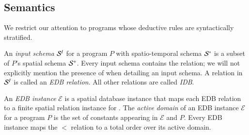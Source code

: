 



\subsection{Semantics}
\label{sec:semantics}
We restrict our attention to \lang programs whose deductive rules are syntactically stratified.


An {\em input schema} $\ischema$ for a \lang program $P$ with spatio-temporal schema $\stschema$ is a subset of $P$'s spatial schema $\sschema$.  Every input schema contains the  relation; we will not explicitly mention the presence of  when detailing an input schema.  A relation in $\ischema$ is called an {\em EDB relation}.  All other relations are called {\em IDB}.

An {\em EDB instance} $\mathcal{E}$ is a spatial database instance that maps each EDB relation  to a finite spatial relation instance for . The {\em active domain}
of an EDB instance $\mathcal{E}$ for a program $P$ is the set of constants appearing in $\mathcal{E}$ and $P$.  Every EDB instance maps the $<$ relation to a total order over its active domain.

